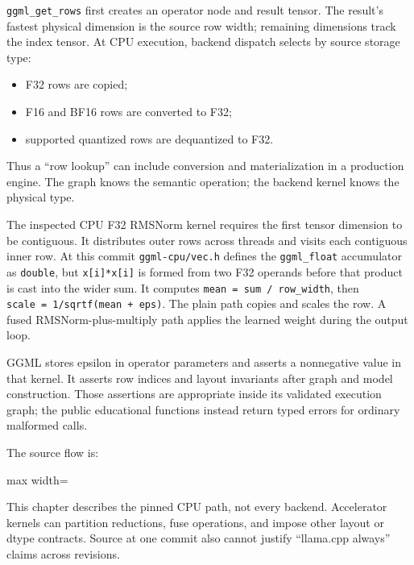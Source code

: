 \documentclass[
  10pt,
]{article}
\providecommand{\tightlist}{%
  \setlength{\itemsep}{0pt}\setlength{\parskip}{0pt}}
\begin{document}
\texttt{ggml\_get\_rows} first creates an operator node and result
tensor. The result's fastest physical dimension is the source row width;
remaining dimensions track the index tensor. At CPU execution, backend
dispatch selects by source storage type:

\begin{itemize}
\tightlist
\item
  F32 rows are copied;
\item
  F16 and BF16 rows are converted to F32;
\item
  supported quantized rows are dequantized to F32.
\end{itemize}

Thus a ``row lookup'' can include conversion and materialization in a
production engine. The graph knows the semantic operation; the backend
kernel knows the physical type.

The inspected CPU F32 RMSNorm kernel requires the first tensor dimension
to be contiguous. It distributes outer rows across threads and visits
each contiguous inner row. At this commit \texttt{ggml-cpu/vec.h}
defines the \texttt{ggml\_float} accumulator as \texttt{double}, but
\texttt{x{[}i{]}*x{[}i{]}} is formed from two F32 operands before that
product is cast into the wider sum. It computes
\texttt{mean\ =\ sum\ /\ row\_width}, then
\texttt{scale\ =\ 1/sqrtf(mean\ +\ eps)}. The plain path copies and
scales the row. A fused RMSNorm-plus-multiply path applies the learned
weight during the output loop.

GGML stores epsilon in operator parameters and asserts a nonnegative
value in that kernel. It asserts row indices and layout invariants after
graph and model construction. Those assertions are appropriate inside
its validated execution graph; the public educational functions instead
return typed errors for ordinary malformed calls.

The source flow is:

\begin{center}\begin{adjustbox}{max width=\linewidth}\end{adjustbox}\end{center}

This chapter describes the pinned CPU path, not every backend.
Accelerator kernels can partition reductions, fuse operations, and
impose other layout or dtype contracts. Source at one commit also cannot
justify ``llama.cpp always'' claims across revisions.
\end{document}
